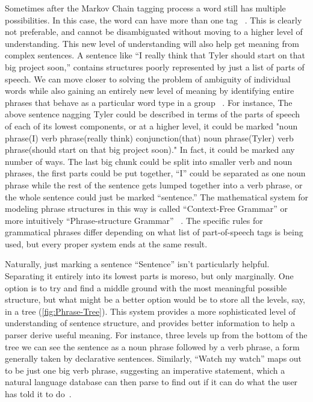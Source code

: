 \documentclass[12pt]{article}
\begin{document}
Sometimes after the Markov Chain tagging process a word still has multiple possibilities. In this case, the word can have more than one tag ~\citep{Tomita}. This is clearly not preferable, and cannot be disambiguated without moving to a higher level of understanding. This new level of understanding will also help get meaning from complex sentences. A sentence like ``I really think that Tyler should start on that big project soon,'' contains structures poorly represented by just a list of parts of speech. We can move closer to solving the problem of ambiguity of individual words while also gaining an entirely new level of meaning by identifying entire phrases that behave as a particular word type in a group ~\citep{Jurafsky}. For instance, The above sentence nagging Tyler could be described in terms of the parts of speech of each of its lowest components, or at a higher level, it could be marked "noun phrase(I) verb phrase(really think) conjunction(that) noun phrase(Tyler) verb phrase(should start on that big project soon)." In fact, it could be marked any number of ways. The last big chunk could be split into smaller verb and noun phrases, the first parts could be put together, ``I'' could be separated as one noun phrase while the rest of the sentence gets lumped together into a verb phrase, or the whole sentence could just be marked ``sentence.'' The mathematical system for modeling phrase structures in this way is called ``Context-Free Grammar'' or more intuitively ``Phrase-structure Grammar'' ~\citep{Peters}. The specific rules for grammatical phrases differ depending on what list of part-of-speech tags is being used, but every proper system ends at the same result.

Naturally, just marking a sentence ``Sentence'' isn't particularly helpful. Separating it entirely into its lowest parts is moreso, but only marginally.  One option is to try and find a middle ground with the most meaningful possible structure, but what might be a better option would be to store all the levels, say, in a tree (\ref{fig:Phrase-Tree}). This system provides a more sophisticated level of understanding of sentence structure, and provides better information to help a parser derive useful meaning. For instance, three levels up from the bottom of the tree we can see the sentence as a noun phrase followed by a verb phrase, a form generally taken by declarative sentences. Similarly, ``Watch my watch'' maps out to be just one big verb phrase, suggesting an imperative statement, which a natural language database can then parse to find out if it can do what the user has told it to do~\citep{Jurafsky}. 
\end{document}
